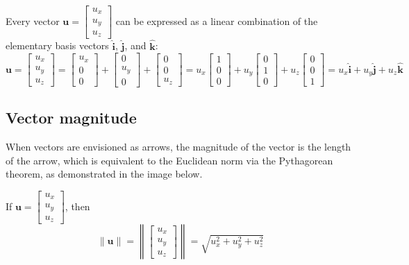 \documentclass{article}
\begin{document}
Every vector \(\mathbf{u} = \begin{bmatrix} u_x \\ u_y \\ u_z \end{bmatrix}\) can be expressed as a linear combination of the elementary basis vectors \(\hat{\mathbf{i}}\), \(\hat{\mathbf{j}}\), and \(\hat{\mathbf{k}}\):
\[\mathbf{u} = \begin{bmatrix} u_x \\ u_y \\ u_z \end{bmatrix} = \begin{bmatrix} u_x \\ 0 \\ 0 \end{bmatrix} + \begin{bmatrix} 0 \\ u_y \\ 0 \end{bmatrix} + \begin{bmatrix} 0 \\ 0 \\ u_z \end{bmatrix} = u_x\begin{bmatrix} 1 \\ 0 \\ 0 \end{bmatrix} + u_y\begin{bmatrix} 0 \\ 1 \\ 0 \end{bmatrix} + u_z\begin{bmatrix} 0 \\ 0 \\ 1 \end{bmatrix} = u_x \hat{\mathbf{i}} + u_y \hat{\mathbf{j}} + u_z \hat{\mathbf{k}}\]



\subsection*{Vector magnitude}

When vectors are envisioned as arrows, the magnitude of the vector is the length of the arrow, which is equivalent to the Euclidean norm via the Pythagorean theorem, as demonstrated in the image below. 

If \(\mathbf{u} = \begin{bmatrix} u_x \\ u_y \\ u_z \end{bmatrix}\), then 
\[\|\mathbf{u}\| = \left\|\begin{bmatrix} u_x \\ u_y \\ u_z \end{bmatrix}\right\| = \sqrt{u_x^2 + u_y^2 + u_z^2}\]
\end{document}
